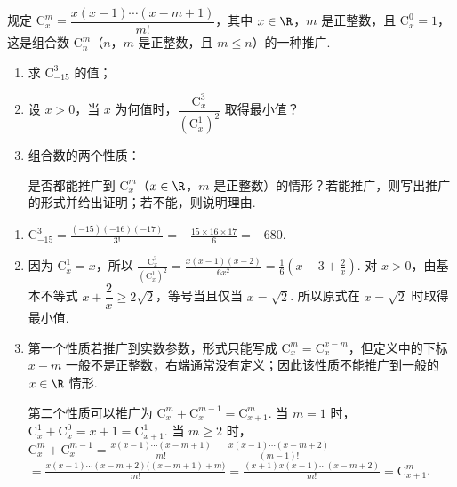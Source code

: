 \begin{problem}
规定 \(\mathrm C_{x}^{m} = \dfrac{x(x - 1)\cdots(x - m + 1)}{m!}\)，其中 \(x \in \R\)，\(m\) 是正整数，且 \(\mathrm C_{x}^{0} = 1\)，这是组合数 \(\mathrm C_{n}^{m}\)（\(n\)，\(m\) 是正整数，且 \(m \leqslant n\)）的一种推广.

\begin{enumerate}
\item 求 \(\mathrm C_{-15}^{3}\) 的值；
\item 设 \(x > 0\)，当 \(x\) 为何值时，\(\dfrac{\mathrm C_{x}^{3}}{(\mathrm C_{x}^{1})^{2}}\) 取得最小值？
\item 组合数的两个性质：


是否都能推广到 \(\mathrm C_{x}^{m}\)（\(x \in \R\)，\(m\) 是正整数）的情形？若能推广，则写出推广的形式并给出证明；若不能，则说明理由.
\end{enumerate}
\end{problem}

\begin{solution}
\begin{enumerate}
    \item \(\displaystyle\mathrm C_{-15}^{3}=\frac{(-15)(-16)(-17)}{3!}=-\frac{15\times16\times17}{6}=-680\).
\item 因为 \(\mathrm C_x^1=x\)，所以
\(\displaystyle\frac{\mathrm C_x^3}{(\mathrm C_x^1)^2}=\frac{x(x-1)(x-2)}{6x^2}=\frac{1}{6}\left(x-3+\frac{2}{x}\right)\).
对 \(x>0\)，由基本不等式 \(x+\dfrac{2}{x}\geqslant2\sqrt{2}\)，等号当且仅当 \(x=\sqrt{2}\). 所以原式在 \(x=\sqrt{2}\) 时取得最小值.
\item 第一个性质若推广到实数参数，形式只能写成 \(\mathrm C_x^m=\mathrm C_x^{x-m}\)，但定义中的下标 \(x-m\) 一般不是正整数，右端通常没有定义；因此该性质不能推广到一般的 \(x\in\R\) 情形.

第二个性质可以推广为 \(\mathrm C_x^m+\mathrm C_x^{m-1}=\mathrm C_{x+1}^m\). 当 \(m=1\) 时，
\(\mathrm C_x^1+\mathrm C_x^0=x+1=\mathrm C_{x+1}^1\). 当 \(m\geqslant2\) 时，
\(\displaystyle\mathrm C_x^m+\mathrm C_x^{m-1}=\frac{x(x-1)\cdots(x-m+1)}{m!}+\frac{x(x-1)\cdots(x-m+2)}{(m-1)!}\)
\(\displaystyle=\frac{x(x-1)\cdots(x-m+2)\bigl((x-m+1)+m\bigr)}{m!}=\frac{(x+1)x(x-1)\cdots(x-m+2)}{m!}=\mathrm C_{x+1}^m\).
\end{enumerate}
\end{solution}
